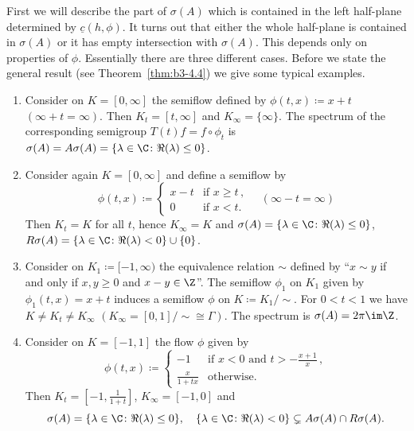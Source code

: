 First we will describe the part of\/ $\sigma(A)$ which is contained in the left half-plane determined by $\underline{c}(h,\phi)$.
It turns out that either the whole half-plane is contained in $\sigma(A)$ or it has empty intersection with $\sigma(A)$.
This depends only on properties of\/ $\phi$.
Essentially there 
are three different cases. 
Before we state the general result (see Theorem~\ref{thm:b3-4.4}) we give some typical examples.
\begin{examples}\label{ex:b3-4.3}
	\begin{enumerate}[\upshape (i), wide, labelindent=.25em]
	\item 
	Consider on $K = [0,\infty]$ the semiflow defined by $\phi(t,x) \coloneq x + t$ $(\infty + t = \infty)$.
	Then $K_{t} = [t,\infty]$ and $K_{\infty} = \{\infty\}$.
	The spectrum of the corresponding semigroup $T(t)f = f\circ\phi_{t}$ is $\sigma(A) = A\sigma(A) = \{\lambda \in \C \colon \Re(\lambda) \leq 0\}$.
	
	\item 
	Consider again $K = [0,\infty]$ and define a semiflow by
	\[
	\phi(t,x) \coloneq \begin{cases} 
		x - t & \text{if } x \geq t \,,\\
		0 & \text{if } x < t .
	\end{cases} \quad (\infty - t = \infty)
	\]
	Then $K_{t} = K$ for all $t$, hence $K_{\infty} = K$ and $\sigma(A) = \{\lambda \in \C \colon \Re(\lambda) \leq 0\}$, $R\sigma(A) = \{\lambda \in \C \colon \Re(\lambda) < 0\} \cup \{0\}$.
	
	\item 
	Consider on $K_{1} \coloneq [-1,\infty)$ the equivalence relation $\sim$ defined by \enquote{$x \sim y$ if and only if\/ $x,y \geq 0$ and $x - y \in \Z$}.
	The semiflow $\phi_{1}$ on $K_{1}$ given by $\phi_{1}(t,x) = x + t$ induces a semiflow $\phi$ on $K \coloneq K_{1}/{\sim}$.
	For $0 < t < 1$ we have $K \neq K_{t} \neq K_{\infty}$ $(K_{\infty} = [0,1]/{\sim} \cong \Gamma)$.
	The spectrum is $\sigma(A) = 2\pi \im\Z$.
	
	\item 
	Consider on $K = [-1,1]$ the flow $\phi$ given by
	\[
	\phi(t,x)\coloneq \begin{cases}
		-1 & \text{if } x < 0 \text{ and } t > -\frac{x+1}{x} \,, \\
		\frac{x}{1+tx} & \text{otherwise.}
	\end{cases}
	\]
	Then $K_{t} = [-1,\frac{1}{1+t}]$, $K_{\infty} = [-1,0]$ and
	\[
	\sigma(A) = \{\lambda \in \C \colon \Re(\lambda) \leq 0\},\quad 
	\{\lambda \in \C \colon \Re(\lambda) < 0\} \subsetneq A\sigma(A)\cap R\sigma(A).
	\]
	\end{enumerate}
\end{examples}
